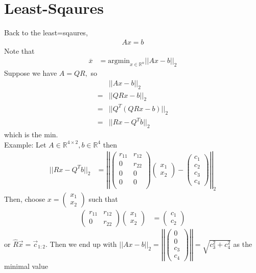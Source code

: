 \documentclass[11pt,oneside]{book}
\theoremstyle{break}
\theoremstyle{break}
\newcommand{\R}{\mathbb{R}}
\newcommand{\example}{\color{purple}Example: \color{black}}
\begin{document}
\section[Least Squares]{Least-Sqaures}
Back to the least=sqaures, \begin{align*}
Ax=b
\end{align*}
Note that \begin{align*}
\overline{x}&=\text{argmin}_{x\in \R^n}||Ax-b||_2
\end{align*}
Suppose we have $A=QR,$ so \begin{align*}
&||Ax-b||_2\\
=&||QRx-b||_2\\
=&||Q^T(QRx-b)||_2\\
=&||Rx-Q^Tb||_2
\end{align*}
which is the min.\\
\example Let $A\in \R^{4\times 2},b\in \R^4$ then \begin{align*}
||Rx-Q^Tb||_2&=\left| \left|\begin{pmatrix}
r_{11}&r_{12}\\
0&r_{22}\\
0&0\\
0&0\\
\end{pmatrix}\begin{pmatrix}
x_1\\
x_2
\end{pmatrix}-
\begin{pmatrix}
c_1\\
c_2\\
c_3\\
c_4
\end{pmatrix}
 \right|\right|_{2}
\end{align*}
Then, choose $x=\begin{pmatrix}
x_1\\
x_2
\end{pmatrix}$ such that \begin{align*}
\begin{pmatrix}
r_{11}&r_{12}\\
0&r_{22}
\end{pmatrix}\begin{pmatrix}
x_1\\
x_2
\end{pmatrix}&=\begin{pmatrix}
c_1\\
c_2
\end{pmatrix}
\end{align*}
or $\hat{R}\vec{x}=\vec{c}_{1:2}$. Then we end up with $||Ax-b||_2= \left|\left|\begin{pmatrix}
0\\
0\\
c_3\\
c_4
\end{pmatrix}
 \right|\right|=\sqrt{c_3^2+c_4^2}$ as the minimal value\\
\end{document}
